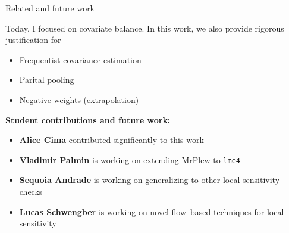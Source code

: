 \begin{frame}{Related and future work}

Today, I focused on covariate balance.  In this work, we also provide rigorous justification for
%
\begin{itemize}
\item Frequentist covariance estimation
\item Parital pooling
\item Negative weights (extrapolation)
\end{itemize}
%
\pause
\textbf{Student contributions and future work:}

\begin{itemize}
\item \textbf{Alice Cima} contributed significantly to this work
\item \textbf{Vladimir Palmin} is working on extending MrPlew to \texttt{lme4}
\item \textbf{Sequoia Andrade} is working on generalizing to other local sensitivity checks
\item \textbf{Lucas Schwengber} is working on novel flow--based techniques for local sensitivity
\end{itemize}



\end{frame}
